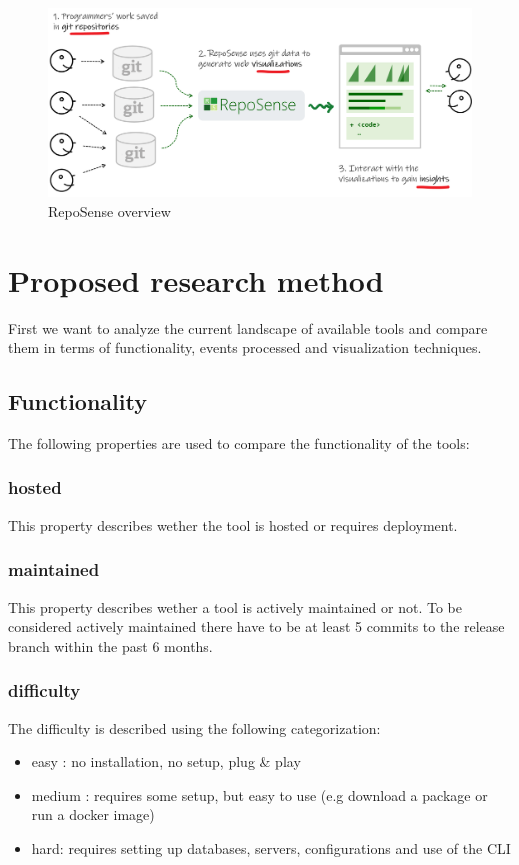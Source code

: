 \documentclass[authoryear,preprint,review,12pt]{elsarticle}
\begin{document}
\begin{figure}[h]
  \centering
  \includegraphics[width=\linewidth]{reposenseOverview}
  \caption{RepoSense overview \citep{RepoSenseHome}}
  \label{fig:reposense}
\end{figure}

\section{Proposed research method}
\label{sec:method}

First we want to analyze the current landscape of available tools and compare them in terms of
functionality, events processed and visualization techniques.

\subsection{Functionality}
The following properties are used to compare the functionality of the tools:

\subsubsection{hosted}
This property describes wether the tool is hosted or requires deployment.

\subsubsection{maintained}
This property describes wether a tool is actively maintained or not. To be considered actively
maintained there have to be at least 5 commits to the release branch within the past 6 months.

\subsubsection{difficulty}
The difficulty is described using the following categorization:
\begin{itemize}
  \item easy : no installation, no setup, plug \& play
  \item medium : requires some setup, but easy to use (e.g download a package or run a docker image)
  \item hard: requires setting up databases, servers, configurations and use of the CLI
\end{itemize}
\end{document}
